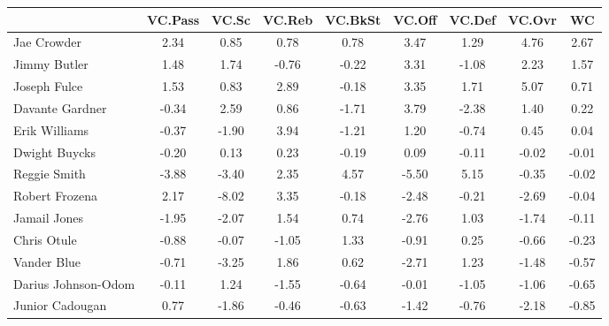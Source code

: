 \documentclass[10pt,letterpaper]{article}
\begin{document}
\begin{table}[ht]
\begin{center}
\begin{tabular}{lcccccccc}
  \hline
 & VC.Pass & VC.Sc & VC.Reb & VC.BkSt & VC.Off & VC.Def & VC.Ovr & WC \\ 
  \hline
Jae Crowder & 2.34 & 0.85 & 0.78 & 0.78 & 3.47 & 1.29 & 4.76 & 2.67 \\ 
  Jimmy Butler & 1.48 & 1.74 & -0.76 & -0.22 & 3.31 & -1.08 & 2.23 & 1.57 \\ 
  Joseph Fulce & 1.53 & 0.83 & 2.89 & -0.18 & 3.35 & 1.71 & 5.07 & 0.71 \\ 
  Davante Gardner & -0.34 & 2.59 & 0.86 & -1.71 & 3.79 & -2.38 & 1.40 & 0.22 \\ 
  Erik Williams & -0.37 & -1.90 & 3.94 & -1.21 & 1.20 & -0.74 & 0.45 & 0.04 \\ 
  Dwight Buycks & -0.20 & 0.13 & 0.23 & -0.19 & 0.09 & -0.11 & -0.02 & -0.01 \\ 
  Reggie Smith & -3.88 & -3.40 & 2.35 & 4.57 & -5.50 & 5.15 & -0.35 & -0.02 \\ 
  Robert Frozena & 2.17 & -8.02 & 3.35 & -0.18 & -2.48 & -0.21 & -2.69 & -0.04 \\ 
  Jamail Jones & -1.95 & -2.07 & 1.54 & 0.74 & -2.76 & 1.03 & -1.74 & -0.11 \\ 
  Chris Otule & -0.88 & -0.07 & -1.05 & 1.33 & -0.91 & 0.25 & -0.66 & -0.23 \\ 
  Vander Blue & -0.71 & -3.25 & 1.86 & 0.62 & -2.71 & 1.23 & -1.48 & -0.57 \\ 
  Darius Johnson-Odom & -0.11 & 1.24 & -1.55 & -0.64 & -0.01 & -1.05 & -1.06 & -0.65 \\ 
  Junior Cadougan & 0.77 & -1.86 & -0.46 & -0.63 & -1.42 & -0.76 & -2.18 & -0.85 \\ 
   \hline
\end{tabular}
\end{center}
\end{table}
\newpage
\end{document}
